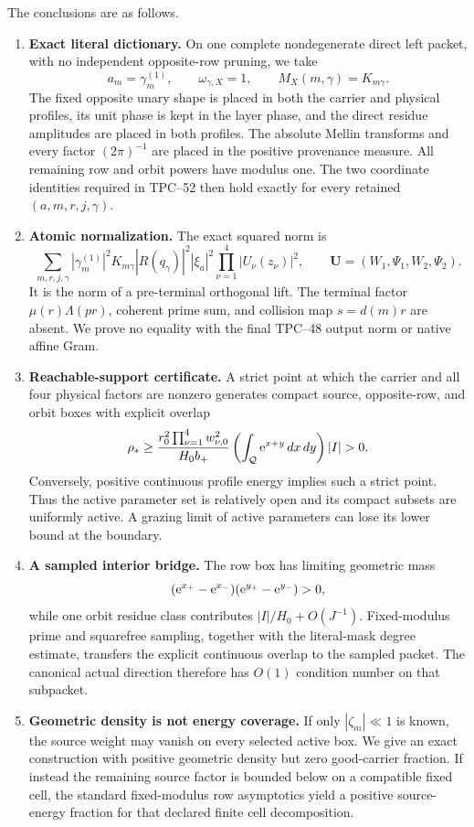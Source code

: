 The conclusions are as follows.

\begin{enumerate}[label=\textup{(R\arabic*)},leftmargin=3.2em]
 \item \textbf{Exact literal dictionary.}
 On one complete nondegenerate direct left packet, with no independent
 opposite-row pruning, we take
 \[
 a_m=\gamma_m^{(1)},\qquad
 \omega_{\gamma,X}=1,\qquad
 M_X(m,\gamma)=K_{m\gamma}.
 \]
 The fixed opposite unary shape is placed in both the carrier and
 physical profiles, its unit phase is kept in the layer phase, and the
 direct residue amplitudes are placed in both profiles.  The absolute
 Mellin transforms and every factor
 \((2\pi)^{-1}\) are placed in the positive provenance measure.  All
 remaining row and orbit powers have modulus one.  The two coordinate
 identities required in TPC--52 then hold exactly for every retained
 \((a,m,r,j,\gamma)\).

 \item \textbf{Atomic normalization.}
 The exact squared norm is
 \[
 \sum_{m,r,j,\gamma}
 |\gamma_m^{(1)}|^2K_{m\gamma}|R(q_\gamma)|^2|\xi_a|^2
 \prod_{\nu=1}^4|U_{\nu}(z_{\nu})|^2,
 \qquad \mathbf U=(W_1,\Psi_1,W_2,\Psi_2).
 \]
 It is the norm of a pre-terminal orthogonal lift.  The terminal factor
 \(\mu(r)\Lambda(pr)\), coherent prime sum, and collision map
 \(s=d(m)r\) are absent.  We prove no equality with the final
 TPC--48 output norm or native affine Gram.

 \item \textbf{Reachable-support certificate.}
 A strict point at which the carrier and all four physical factors are
 nonzero generates compact source, opposite-row, and orbit boxes with
 explicit overlap
 \[
 \rho_*
 \ge
 \frac{r_0^2\prod_{\nu=1}^4w_{\nu,0}^2}{H_0b_+}
 \left(\int_{\cQ}\e^{x+y}\,dx\,dy\right)|I|>0.
 \]
 Conversely, positive continuous profile energy implies such a strict
 point.  Thus the active parameter set is relatively open and its compact subsets
 are uniformly active.  A grazing limit of active parameters can lose
 its lower bound at the boundary.

 \item \textbf{A sampled interior bridge.}
 The row box has limiting geometric mass
 \[
 (\mathrm e^{x_+}-\mathrm e^{x_-})(\mathrm e^{y_+}-\mathrm e^{y_-})>0,
 \]
 while one orbit residue class contributes
 \( |I|/H_0+O(J^{-1})\).  Fixed-modulus prime and squarefree sampling,
 together with the literal-mask degree estimate, transfers the explicit
 continuous overlap to the sampled packet.  The canonical actual
 direction therefore has \(O(1)\) condition number on that subpacket.

 \item \textbf{Geometric density is not energy coverage.}
 If only \(|\zeta_m|\ll1\) is known, the source weight may vanish on
 every selected active box.  We give an exact construction with positive
 geometric density but zero good-carrier fraction.  If instead the
 remaining source factor is bounded below on a compatible fixed cell, the
 standard fixed-modulus row asymptotics yield a positive source-energy
 fraction for that declared finite cell decomposition.
\end{enumerate}

